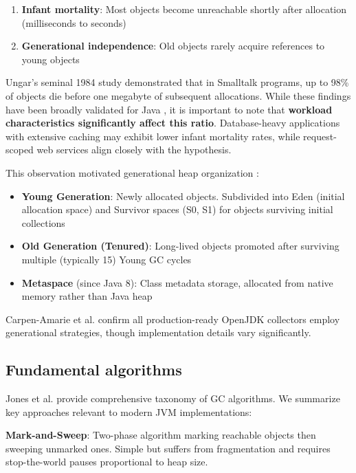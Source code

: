 \begin{enumerate}
    \item \textbf{Infant mortality}: Most objects become unreachable shortly after allocation (milliseconds to seconds)
    \item \textbf{Generational independence}: Old objects rarely acquire references to young objects
\end{enumerate}

Ungar's seminal 1984 study \cite{ungar1984generation} demonstrated that in Smalltalk programs, up to 98\% of objects die before one megabyte of subsequent allocations. While these findings have been broadly validated for Java \cite{carpen2015performance, blackburn2006dacapo}, it is important to note that \textbf{workload characteristics significantly affect this ratio}. Database-heavy applications with extensive caching may exhibit lower infant mortality rates, while request-scoped web services align closely with the hypothesis.

This observation motivated generational heap organization \cite{jones2011garbage, oracle2023gc}:

\begin{itemize}
    \item \textbf{Young Generation}: Newly allocated objects. Subdivided into Eden (initial allocation space) and Survivor spaces (S0, S1) for objects surviving initial collections
    \item \textbf{Old Generation (Tenured)}: Long-lived objects promoted after surviving multiple (typically 15) Young GC cycles
    \item \textbf{Metaspace} (since Java 8): Class metadata storage, allocated from native memory rather than Java heap
\end{itemize}

Carpen-Amarie et al. \cite{carpen2015performance} confirm all production-ready OpenJDK collectors employ generational strategies, though implementation details vary significantly.

\subsection{Fundamental algorithms}
\label{subsec:basic-algorithms}

Jones et al. \cite{jones2011garbage} provide comprehensive taxonomy of GC algorithms. We summarize key approaches relevant to modern JVM implementations:

\textbf{Mark-and-Sweep}: Two-phase algorithm marking reachable objects then sweeping unmarked ones. Simple but suffers from fragmentation and requires stop-the-world pauses proportional to heap size.

